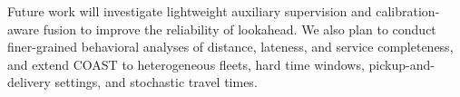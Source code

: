 \documentclass[letterpaper]{article}
\begin{document}
Future work will investigate lightweight auxiliary supervision and calibration-aware fusion to improve the reliability of lookahead. We also plan to conduct finer-grained behavioral analyses of distance, lateness, and service completeness, and extend COAST to heterogeneous fleets, hard time windows, pickup-and-delivery settings, and stochastic travel times.



\end{document}
